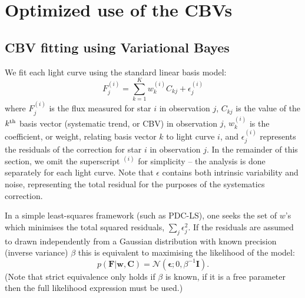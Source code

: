 \documentclass[useAMS,usenatbib]{mn2e}
\begin{document}
\section{Optimized use of the CBVs}
\label{sec:cbv}

\subsection{CBV fitting using Variational Bayes}

We fit each light curve using the standard linear basis model:
\begin{equation}
F^{(i)}_j = \sum_{k=1}^K w^{(i)}_k C_{kj} + \epsilon^{(i)}_j
\end{equation}
where $F^{(i)}_j$ is the flux measured for star $i$ in observation
$j$, $C_{kj}$ is the value of the $k^{\rm th}$ basis vector
(systematic trend, or CBV) in observation $j$, $w^{(i)}_k$ is the
coefficient, or weight, relating basis vector $k$ to light curve $i$,
and $\epsilon^{(i)}_j$ represents the residuals of the correction for
star $i$ in observation $j$. In the remainder of this section, we omit
the superscript $^{(i)}$ for simplicity -- the analysis is done
separately for each light curve. Note that $\epsilon$ contains both
intrinsic variability and noise, representing the total residual for the
purposes of the systematics correction.

In a simple least-squares framework (such as PDC-LS), one seeks the
set of $w$'s which minimises the total squared residuals, $
\sum_j \epsilon_j^2 $. If the residuals are assumed to drawn
independently from a Gaussian distribution with known precision (inverse
variance) $\beta$ this is equivalent to
maximising the likelihood of the model:
\begin{equation}
p(\mathbf{F}|\mathbf{w},\mathbf{C}) =
\mathcal{N}(\boldsymbol{\epsilon};0,\beta^{-1} \mathbf{I}).
\end{equation}
(Note that strict equivalence only holds if $\beta$ is known, if it is
a free parameter then the full likelihood expression must be used.)
\end{document}
